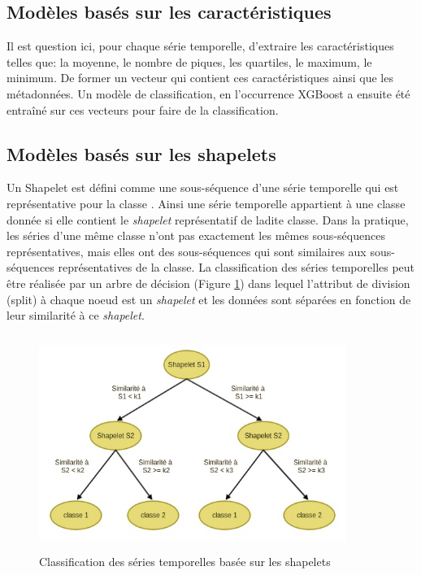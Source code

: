 \subsection{Modèles basés sur les caractéristiques}\label{sec:feature_based_model}
Il est question ici, pour chaque série temporelle, d'extraire les caractéristiques telles que: la moyenne, le nombre de piques, les quartiles, le maximum, le minimum. De former un vecteur qui contient ces caractéristiques ainsi que les métadonnées. Un modèle de classification, en l'occurrence XGBoost\cite{chen2016xgboost} a ensuite été entraîné sur ces vecteurs pour faire de la classification.

\subsection{Modèles basés sur les shapelets}\label{sec:shapelet_based_model}
Un Shapelet est défini comme une sous-séquence d'une série temporelle qui est représentative pour la classe \citep{ye2009time}. Ainsi une série temporelle appartient à une classe donnée si elle contient le \textit{shapelet} représentatif de ladite classe. Dans la pratique, les séries d'une même classe n'ont pas exactement les mêmes sous-séquences représentatives, mais elles ont des sous-séquences qui sont similaires aux sous-séquences représentatives de la classe. 
La classification des séries temporelles peut être réalisée par un arbre de décision (Figure \ref{fig:shapelet_based_dt}) dans lequel l'attribut de division (split) à chaque noeud est un \textit{shapelet} et les données sont séparées en fonction de leur similarité à ce \textit{shapelet}.

\begin{figure}[!h]
    \centering
    \includegraphics[width=10cm,height=7cm]{report/figures/shapelet-based-tree.jpg}
    \caption{Classification des séries temporelles basée sur les shapelets}
    \label{fig:shapelet_based_dt}
\end{figure}


